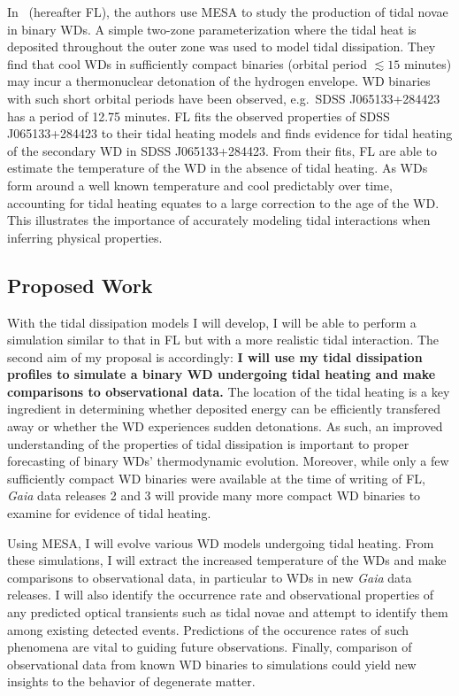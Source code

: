 \documentclass[12pt,
        usenames, %
        dvipsnames %
    ]{article}
\begin{document}
In~\cite{tidal_novae} (hereafter FL), the authors use MESA to study the
production of tidal novae in binary WDs. A simple two-zone parameterization
where the tidal heat is deposited throughout the outer zone was used to model
tidal dissipation. They find that cool WDs in sufficiently compact binaries
(orbital period $\lesssim 15$ minutes) may incur a thermonuclear detonation of
the hydrogen envelope. WD binaries with such short orbital periods have been
observed, e.g.\ SDSS J065133+284423 has a period of 12.75 minutes\cite{12min}.
FL fits the observed properties of SDSS J065133+284423 to their tidal heating
models and finds evidence for tidal heating of the secondary WD in SDSS
J065133+284423. From their fits, FL are able to estimate the temperature of the
WD in the absence of tidal heating. As WDs form around a well known temperature
and cool predictably over time, accounting for tidal heating equates to a large
correction to the age of the WD\@. This illustrates the importance of accurately
modeling tidal interactions when inferring physical properties.

\subsection{Proposed Work}

With the tidal dissipation models I will develop, I will be able to perform a
simulation similar to that in FL but with a more realistic tidal interaction.
The second aim of my proposal is accordingly: \textbf{I will use my tidal
dissipation profiles to simulate a binary WD undergoing tidal heating and make
comparisons to observational data.} The location of the tidal heating is a key
ingredient in determining whether deposited energy can be efficiently transfered
away or whether the WD experiences sudden detonations. As such, an improved
understanding of the properties of tidal dissipation is important to proper
forecasting of binary WDs' thermodynamic evolution. Moreover, while only a few
sufficiently compact WD binaries were available at the time of writing of FL,
\emph{Gaia} data releases 2 and 3 will provide many more compact WD binaries to
examine for evidence of tidal heating.

Using MESA, I will evolve various WD models undergoing tidal heating. From these
simulations, I will extract the increased temperature of the WDs and make
comparisons to observational data, in particular to WDs in new \emph{Gaia} data
releases. I will also identify the occurrence rate and observational properties
of any predicted optical transients such as tidal novae and attempt to identify
them among existing detected events. Predictions of the occurence rates of such
phenomena are vital to guiding future observations. Finally, comparison of
observational data from known WD binaries to simulations could yield new
insights to the behavior of degenerate matter.
\end{document}
